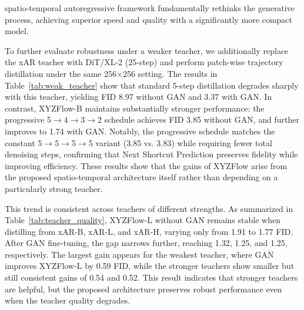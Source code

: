 \documentclass{article}
\theoremstyle{plain}
\theoremstyle{definition}
\theoremstyle{remark}
\begin{document}
spatio-temporal autoregressive framework fundamentally rethinks the generative process, achieving superior speed and quality with a significantly more compact model.

To further evaluate robustness under a weaker teacher, we additionally replace the xAR teacher with DiT/XL-2 (25-step) and perform patch-wise trajectory distillation under the same 256$\times$256 setting. The results in Table~\ref{tab:weak_teacher} show that standard 5-step distillation degrades sharply with this teacher, yielding FID 8.97 without GAN and 3.37 with GAN. In contrast, XYZFlow-B maintains substantially stronger performance: the progressive 5$\rightarrow$4$\rightarrow$3$\rightarrow$2 schedule achieves FID 3.85 without GAN, and further improves to 1.74 with GAN. Notably, the progressive schedule matches the constant 5$\rightarrow$5$\rightarrow$5$\rightarrow$5 variant (3.85 vs. 3.83) while requiring fewer total denoising steps, confirming that Next Shortcut Prediction preserves fidelity while improving efficiency. These results show that the gains of XYZFlow arise from the proposed spatio-temporal architecture itself rather than depending on a particularly strong teacher.

This trend is consistent across teachers of different strengths. As summarized in Table~\ref{tab:teacher_quality}, XYZFlow-L without GAN remains stable when distilling from xAR-B, xAR-L, and xAR-H, varying only from 1.91 to 1.77 FID. After GAN fine-tuning, the gap narrows further, reaching 1.32, 1.25, and 1.25, respectively. The largest gain appears for the weakest teacher, where GAN improves XYZFlow-L by 0.59 FID, while the stronger teachers show smaller but still consistent gains of 0.54 and 0.52. This result indicates that stronger teachers are helpful, but the proposed architecture preserves robust performance even when the teacher quality degrades.
\end{document}

